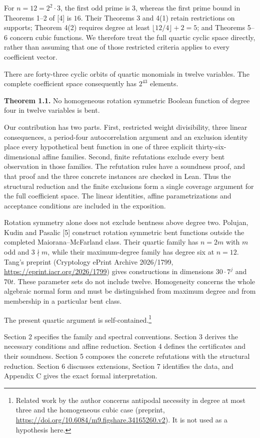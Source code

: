 \documentclass[11pt,a4paper]{article}
\begin{document}
For $n=12=2^2\cdot3$, the first odd prime is $3$, whereas the first prime bound in Theorems 1--2 of [4] is $16$. Their Theorems 3 and 4(1) retain restrictions on supports; Theorem 4(2) requires degree at least $\lfloor12/4\rfloor+2=5$; and Theorems 5--6 concern cubic functions. We therefore treat the full quartic cyclic space directly, rather than assuming that one of those restricted criteria applies to every coefficient vector.

There are forty-three cyclic orbits of quartic monomials in twelve variables. The complete coefficient space consequently has $2^{43}$ elements.

\textbf{Theorem 1.1.} No homogeneous rotation symmetric Boolean function of degree four in twelve variables is bent.

Our contribution has two parts. First, restricted weight divisibility, three linear consequences, a period-four autocorrelation argument and an exclusion identity place every hypothetical bent function in one of three explicit thirty-six-dimensional affine families. Second, finite refutations exclude every bent observation in those families. The refutation rules have a soundness proof, and that proof and the three concrete instances are checked in Lean. Thus the structural reduction and the finite exclusions form a single coverage argument for the full coefficient space. The linear identities, affine parametrizations and acceptance conditions are included in the exposition.

Rotation symmetry alone does not exclude bentness above degree two. Polujan, Kudin and Pasalic [5] construct rotation symmetric bent functions outside the completed Maiorana--McFarland class. Their quartic family has $n=2m$ with $m$ odd and $3\nmid m$, while their maximum-degree family has degree six at $n=12$. Tang's preprint (Cryptology ePrint Archive 2026/1799, \url{https://eprint.iacr.org/2026/1799}) gives constructions in dimensions $30\cdot7^j$ and $70t$. These parameter sets do not include twelve. Homogeneity concerns the whole algebraic normal form and must be distinguished from maximum degree and from membership in a particular bent class.

The present quartic argument is self-contained.\footnote{Related work by the author concerns antipodal necessity in degree at most three and the homogeneous cubic case (preprint, \url{https://doi.org/10.6084/m9.figshare.34165260.v2}). It is not used as a hypothesis here.}


Section 2 specifies the family and spectral conventions. Section 3 derives the necessary conditions and affine reduction. Section 4 defines the certificates and their soundness. Section 5 composes the concrete refutations with the structural reduction. Section 6 discusses extensions, Section 7 identifies the data, and Appendix C gives the exact formal interpretation.
\end{document}
